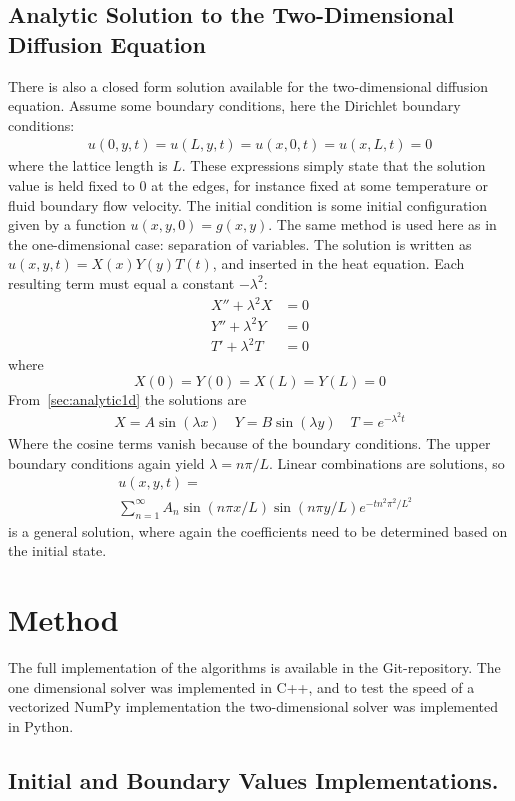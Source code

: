\documentclass[aps,reprint]{revtex4-1}
\begin{document}
\subsection{Analytic Solution to the Two-Dimensional Diffusion Equation}
There is also a closed form solution available for the two-dimensional diffusion equation.
Assume some boundary conditions, here the Dirichlet boundary conditions: 
\begin{align*}
  u(0, y, t) = u(L, y, t) = u(x, 0, t) = u(x, L, t) = 0
\end{align*}
where the lattice length is $L$. These expressions simply state that the solution
value is held fixed to $0$ at the edges, for instance fixed at some temperature or fluid
boundary flow velocity. The initial condition is some initial configuration given by a function $u(x,y,0) = g(x,y)$.
The same method is used here as in the one-dimensional case: separation of variables. The solution
is written as $u(x,y,t) = X(x) Y(y) T(t)$, and inserted in the heat equation. Each resulting
term must equal a constant $-\lambda^2$:
\begin{align*}
  X'' + \lambda^2 X &= 0 \\
  Y'' + \lambda^2 Y &= 0 \\
  T'  + \lambda^2 T &= 0
\end{align*}
where
\[X(0) = Y(0) = X(L) = Y(L) = 0\]
From~\ref{sec:analytic1d} the solutions are
\begin{align*}
  X = A \sin{(\lambda x)} \quad Y = B \sin{(\lambda y)} \quad T = e^{-\lambda^2 t}
\end{align*}
Where the cosine terms vanish because of the boundary conditions. The upper
boundary conditions again yield $\lambda = n \pi / L$. Linear combinations
are solutions, so
\begin{align*}
  &u(x,y,t) = \\&\sum_{n = 1}^{\infty} A_{n} \sin{(n \pi x / L)} \sin{(n \pi y / L)} e^{- t n^2 \pi^2 / L^2}
\end{align*}
is a general solution, where again the coefficients need to be determined based
on the initial state.
\section{Method} \label{sec:method}
The full implementation of the algorithms is available in the Git-repository.
The one dimensional solver was implemented in C++, and to test the speed of
a vectorized NumPy implementation the two-dimensional solver was implemented in Python.
\subsection{Initial and Boundary Values Implementations.}
\end{document}
